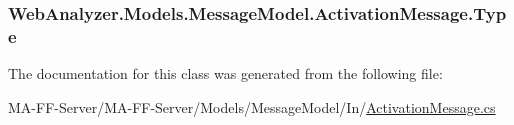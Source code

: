 \subsubsection[{Type}]{ Web\+Analyzer.\+Models.\+Message\+Model.\+Activation\+Message.\+Type\hspace{0.3cm}{\ttfamily [get]}}\label{class_web_analyzer_1_1_models_1_1_message_model_1_1_activation_message_a0f68201fb8faad6d3a2a074bc7670313}


The documentation for this class was generated from the following file\+:\begin{DoxyCompactItemize}
\item 
M\+A-\/\+F\+F-\/\+Server/\+M\+A-\/\+F\+F-\/\+Server/\+Models/\+Message\+Model/\+In/\hyperlink{_activation_message_8cs}{Activation\+Message.\+cs}\end{DoxyCompactItemize}

